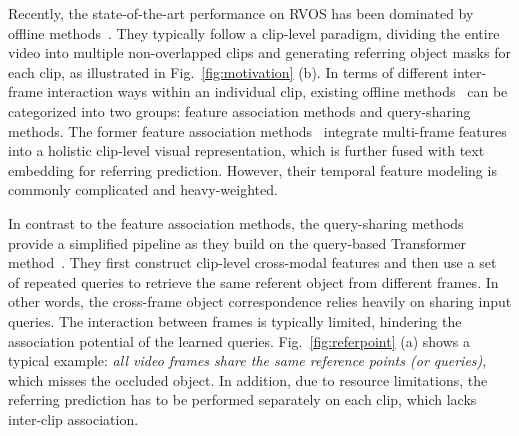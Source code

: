 \documentclass[10pt,twocolumn,letterpaper]{article}
\begin{document}
Recently, the state-of-the-art performance on RVOS has been dominated by offline methods~\cite{wang2019asymmetric,hui2021collaborative,mttr,ding2022language,li2022you,referformer,zhao2022modeling}.
They typically follow a clip-level paradigm, dividing the entire video into multiple non-overlapped clips and generating referring object masks for each clip, as illustrated in Fig.~\ref{fig:motivation} (b).
In terms of different inter-frame interaction ways within an individual clip, existing offline methods~\cite{wang2019asymmetric,hui2021collaborative,mttr,ding2022language,li2022you,referformer,zhao2022modeling} can be categorized into two groups: feature association methods and query-sharing methods.
The former feature association methods~\cite{wang2019asymmetric,hui2021collaborative,li2022you,mlsa,zhao2022modeling} integrate multi-frame features into a holistic clip-level visual representation, which is further fused with text embedding for referring prediction.
However, their temporal feature modeling is commonly complicated and heavy-weighted.



In contrast to the feature association methods, the query-sharing methods~\cite{mttr,referformer} provide a simplified pipeline as they build on the query-based Transformer method~\cite{detr,deformable}.
They first construct clip-level cross-modal features and then use a set of repeated queries to retrieve the same referent object from different frames.
In other words, the cross-frame object correspondence relies heavily on sharing input queries.
The interaction between frames is typically limited, hindering the association potential of the learned queries. Fig.~\ref{fig:referpoint} (a) shows a typical example: \textit{all video frames share the same reference points (or queries)},  which misses the occluded object.
In addition, due to resource limitations, the referring prediction has to be performed separately on each clip, which lacks inter-clip association.
\end{document}
